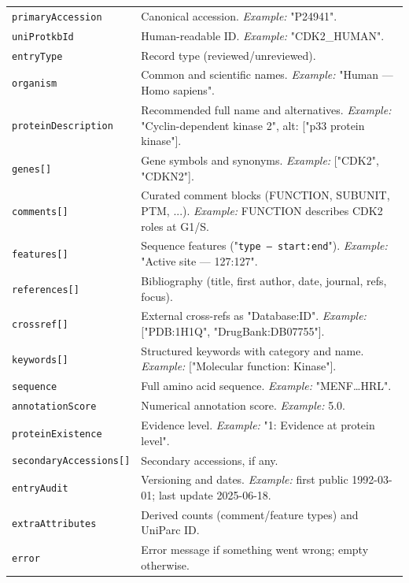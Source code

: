 \documentclass{article}
\begin{document}
\begin{table}[!htbp]
\begin{center}
\begin{tabularx}{\textwidth}{p{5.5cm}X}
\texttt{primaryAccession} & Canonical accession. \emph{Example:} "P24941". \\
\addlinespace
\texttt{uniProtkbId} & Human-readable ID. \emph{Example:} "CDK2\_HUMAN". \\
\addlinespace
\texttt{entryType} & Record type (reviewed/unreviewed). \\
\addlinespace
\texttt{organism} & Common and scientific names. \emph{Example:} "Human — Homo sapiens". \\
\addlinespace
\texttt{proteinDescription} & Recommended full name and alternatives. \emph{Example:} "Cyclin-dependent kinase 2", alt: ["p33 protein kinase"]. \\
\addlinespace
\texttt{genes[]} & Gene symbols and synonyms. \emph{Example:} ["CDK2", "CDKN2"]. \\
\addlinespace
\texttt{comments[]} & Curated comment blocks (FUNCTION, SUBUNIT, PTM, ...). \emph{Example:} FUNCTION describes CDK2 roles at G1/S. \\
\addlinespace
\texttt{features[]} & Sequence features ("\texttt{type — start:end}"). \emph{Example:} "Active site — 127:127". \\
\addlinespace
\texttt{references[]} & Bibliography (title, first author, date, journal, refs, focus). \\
\addlinespace
\texttt{crossref[]} & External cross-refs as "Database:ID". \emph{Example:} ["PDB:1H1Q", "DrugBank:DB07755"]. \\
\addlinespace
\texttt{keywords[]} & Structured keywords with category and name. \emph{Example:} ["Molecular function: Kinase"]. \\
\addlinespace
\texttt{sequence} & Full amino acid sequence. \emph{Example:} "MENF…HRL". \\
\addlinespace
\texttt{annotationScore} & Numerical annotation score. \emph{Example:} 5.0. \\
\addlinespace
\texttt{proteinExistence} & Evidence level. \emph{Example:} "1: Evidence at protein level". \\
\addlinespace
\texttt{secondaryAccessions[]} & Secondary accessions, if any. \\
\addlinespace
\texttt{entryAudit} & Versioning and dates. \emph{Example:} first public 1992-03-01; last update 2025-06-18. \\
\addlinespace
\texttt{extraAttributes} & Derived counts (comment/feature types) and UniParc ID. \\
\addlinespace
\texttt{error} & Error message if something went wrong; empty otherwise. \\
\bottomrule
\end{tabularx}
\end{center}
\end{table}
\end{document}
